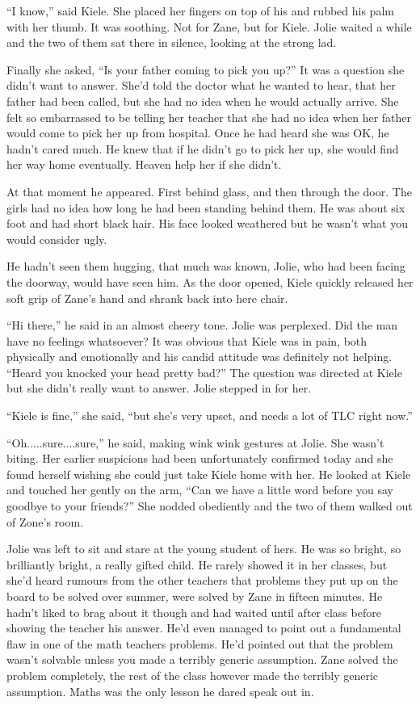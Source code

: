 ``I know,'' said Kiele.  She placed her fingers on top of his and rubbed his palm with her thumb.  It was soothing.  Not for Zane, but for Kiele.  Jolie waited a while and the two of them sat there in silence, looking at the strong lad.  

Finally she asked, ``Is your father coming to pick you up?''  It was a question she didn't want to answer.  She'd told the doctor what he wanted to hear, that her father had been called, but she had no idea when he would actually arrive.  She felt so embarrassed to be telling her teacher that she had no idea when her father would come to pick her up from hospital.  Once he had heard she was OK, he hadn't cared much.  He knew that if he didn't go to pick her up, she would find her way home eventually.  Heaven help her if she didn't.

At that moment he appeared.  First behind glass, and then through the door.  The girls had no idea how long he had been standing behind them.  He was about six foot and had short black hair.  His face looked weathered but he wasn't what you would consider ugly.  

He hadn't seen them hugging, that much was known, Jolie, who had been facing the doorway, would have seen him.  As the door opened, Kiele quickly released her soft grip of Zane's hand and shrank back into here chair.  

``Hi there,'' he said in an almost cheery tone.  Jolie was perplexed.  Did the man have no feelings whatsoever?  It was obvious that Kiele was in pain, both physically and emotionally and his candid attitude was definitely not helping.  ``Heard you knocked your head pretty bad?''  The question was directed at Kiele but she didn't really want to answer.  Jolie stepped in for her.

``Kiele is fine,'' she said, ``but she's very upset, and needs a lot of TLC right now.''  

``Oh.....sure....sure,'' he said, making wink wink gestures at Jolie.  She wasn't biting.  Her earlier suspicions had been unfortunately confirmed today and she found herself wishing she could just take Kiele home with her.  He looked at Kiele and touched her gently on the arm, ``Can we have a little word before you say goodbye to your friends?''  She nodded obediently and the two of them walked out of Zone's room.

Jolie was left to sit and stare at the young student of hers.  He was so bright, so brilliantly bright, a really gifted child.  He rarely showed it in her classes, but she'd heard rumours from the other teachers that problems they put up on the board to be solved over summer, were solved by Zane in fifteen minutes.  He hadn't liked to brag about it though and had waited until after class before showing the teacher his answer.  He'd even managed to point out a fundamental flaw in one of the math teachers problems.  He'd pointed out that the problem wasn't solvable unless you made a terribly generic assumption.  Zane solved the problem completely, the rest of the class however made the terribly generic assumption.  Maths was the only lesson he dared speak out in.



